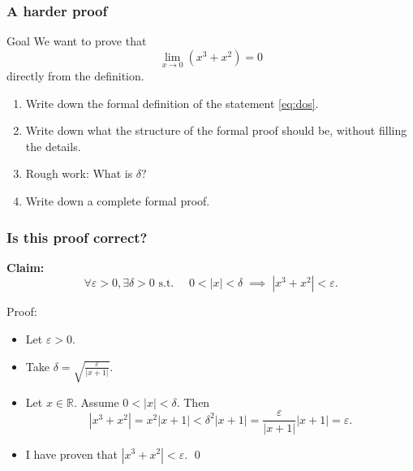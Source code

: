 \documentclass[14pt]{beamer}
\newcommand {\DS} [1] {${\displaystyle #1}$}
\newcommand {\R}{\mathbb{R}}
\newcommand{\e}{\varepsilon}
\begin{document}
\begin{frame}
\frametitle{A harder proof}

\begin{block}{Goal}
	We want to prove that
		\begin{equation} \label{eq:dos}
			\lim_{x \to 0} \left( x^3 + x^2 \right) = 0
		\end{equation}
	directly from the definition.
\end{block}
\vfill 
\begin{enumerate}
\pause	\item  Write down the formal definition of the statement \eqref{eq:dos}.
\pause	\item  Write down what the structure of the formal proof should be, without filling the details.
\pause	\item  Rough work:  What is $\delta?$
\pause	\item  Write down a complete formal proof.
\end{enumerate}
\vfill

\end{frame}
\begin{frame}[t]
\frametitle{Is this proof correct?}

{\bf Claim:}
	$$
		\forall \e >0, \exists \delta>0 \mbox{ s.t. }  \quad 0<|x|<\delta \; \implies \;  |x^3+x^2| < \e.
	$$
\vfill
\begin{block}{Proof:}
	\begin{itemize}
		\item  Let $\e >0$.
		\item  Take \DS{\delta = \sqrt{\frac{\e}{|x+1|}}}.
		\item Let $x \in \R$.  Assume $0 < |x| < \delta$.  Then
			$$
				|x^3+x^2| = x^2 | x + 1| < \delta^2 |x+1| = \frac{\e}{|x+1|} |x+1| = \e.
			$$
		\item	 I have proven that \DS{|x^3+x^2| < \e}. 
		\hfill \qed
	\end{itemize}
\end{block}

\vfill

\end{frame}
\end{document}
